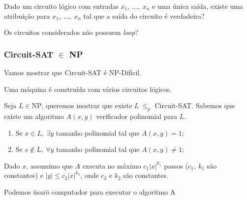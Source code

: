 \documentclass[a4paper,oneside,article,table]{article}
\begin{document}
            Dado um circuito lógico com entradas $x_1,~\ldots,~x_n$ e uma única saída, existe uma atribuição para $x_1,~\ldots,~x_n$ tal que a saída do circuito é verdadeira?

            Os circuitos considerados não possuem \textit{loop}?


            \subsubsection{Circuit-SAT $\in$ NP}
            Vamos mostrar que Circuit-SAT é NP-Difícil.

            
            Uma máquina é construída com vários circuitos lógicos.

            Seja $L \in \textrm{NP}$, queremos mostrar que existe $L~{\leq}_p$ Circuit-SAT.
            Sabemos que existe um algoritmo $A(x,y)$ verificador polinomial para $L$.
            \begin{enumerate}
                \item Se $x \in L,~\exists y$ tamanho polinomial tal que $A(x,y) = 1$;
                \item Se $s \notin L,~\forall y$ tamanho polinomial tal que $A(x,y) \neq 1$;
            \end{enumerate}
            Dado $x$, assumimo que $A$ executa no máximo $c_1|x|^{k_1}$ passos ($c_1,~k_1$ são constantes) e $|y| \leq c_2|x|^{k_2}$, onde $c_2$ e $k_2$ são constantes.

            Podemos \"usar\" o computador para executar o algoritmo A
        

\end{document}
